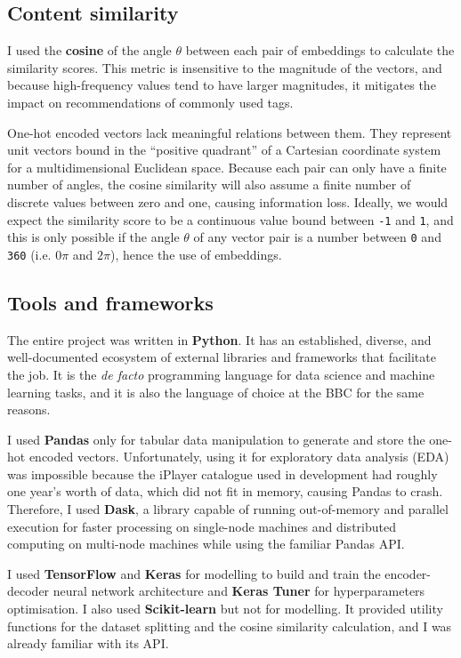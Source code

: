 \subsection{Content similarity}

I used the \textbf{cosine} of the angle $\theta$ between each pair of embeddings to calculate the similarity scores.
This metric is insensitive to the magnitude of the vectors, and because high-frequency values tend to have larger magnitudes,
it mitigates the impact on recommendations of commonly used tags.

One-hot encoded vectors lack meaningful relations between them.
They represent unit vectors bound in the ``positive quadrant'' of a Cartesian coordinate system for a multidimensional Euclidean space.
Because each pair can only have a finite number of angles,
the cosine similarity will also assume a finite number of discrete values between zero and one, causing information loss.
Ideally, we would expect the similarity score to be a continuous value bound between \verb|-1| and \verb|1|,
and this is only possible if the angle $\theta$ of any vector pair is a number between \verb|0| and \verb|360|
(i.e. $0\pi$ and $2\pi$), hence the use of embeddings.

\subsection{Tools and frameworks}

The entire project was written in \textbf{Python}.
It has an established, diverse, and well-documented ecosystem of external libraries and frameworks that facilitate the job.
It is the \textit{de facto} programming language for data science and machine learning tasks,
and it is also the language of choice at the BBC for the same reasons.

I used \textbf{Pandas} only for tabular data manipulation to generate and store the one-hot encoded vectors.
Unfortunately, using it for exploratory data analysis (EDA) was impossible
because the iPlayer catalogue used in development had roughly one year's worth of data,
which did not fit in memory, causing Pandas to crash.
Therefore, I used \textbf{Dask}, a library capable of running out-of-memory and parallel execution for faster processing
on single-node machines and distributed computing on multi-node machines while using the familiar Pandas API.

I used \textbf{TensorFlow} and \textbf{Keras} for modelling to build and train the encoder-decoder neural network architecture
and \textbf{Keras Tuner} for hyperparameters optimisation. I also used \textbf{Scikit-learn} but not for modelling.
It provided utility functions for the dataset splitting and the cosine similarity calculation,
and I was already familiar with its API.

